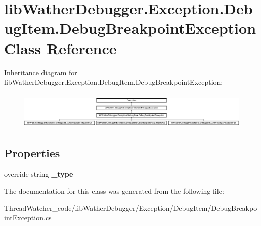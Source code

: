 \hypertarget{classlib_wather_debugger_1_1_exception_1_1_debug_item_1_1_debug_breakpoint_exception}{\section{lib\+Wather\+Debugger.\+Exception.\+Debug\+Item.\+Debug\+Breakpoint\+Exception Class Reference}
\label{classlib_wather_debugger_1_1_exception_1_1_debug_item_1_1_debug_breakpoint_exception}
}
Inheritance diagram for lib\+Wather\+Debugger.\+Exception.\+Debug\+Item.\+Debug\+Breakpoint\+Exception\+:\begin{figure}[H]
\begin{center}
\leavevmode
\includegraphics[height=1.777778cm]{classlib_wather_debugger_1_1_exception_1_1_debug_item_1_1_debug_breakpoint_exception}
\end{center}
\end{figure}
\subsection*{Properties}
\begin{DoxyCompactItemize}
\item 
\hypertarget{classlib_wather_debugger_1_1_exception_1_1_debug_item_1_1_debug_breakpoint_exception_a56fcd7e01f59d1bb6c9cc96b48798452}{override string {\bfseries \+\_\+type}}\label{classlib_wather_debugger_1_1_exception_1_1_debug_item_1_1_debug_breakpoint_exception_a56fcd7e01f59d1bb6c9cc96b48798452}

\end{DoxyCompactItemize}


The documentation for this class was generated from the following file\+:\begin{DoxyCompactItemize}
\item 
Thread\+Watcher\+\_\+code/lib\+Wather\+Debugger/\+Exception/\+Debug\+Item/Debug\+Breakpoint\+Exception.\+cs\end{DoxyCompactItemize}
